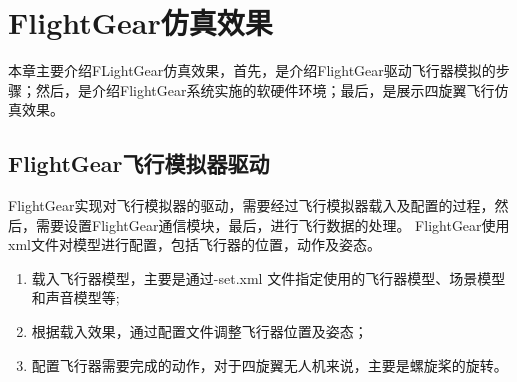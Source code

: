 \chapter{FlightGear仿真效果}\label{forward}

本章主要介绍FLightGear仿真效果，首先，是介绍FlightGear驱动飞行器模拟的步骤；然后，是介绍FlightGear系统实施的软硬件环境；最后，是展示四旋翼飞行仿真效果。
\section{FlightGear飞行模拟器驱动}
FlightGear实现对飞行模拟器的驱动，需要经过飞行模拟器载入及配置的过程，然后，需要设置FlightGear通信模块，最后，进行飞行数据的处理。  FlightGear使用xml文件对模型进行配置，包括飞行器的位置，动作及姿态。
\begin{enumerate}
  \item  载入飞行器模型，主要是通过-set.xml 文件指定使用的飞行器模型、场景模型和声音模型等;
  \item  根据载入效果，通过配置文件调整飞行器位置及姿态；
  \item  配置飞行器需要完成的动作，对于四旋翼无人机来说，主要是螺旋桨的旋转。
\end{enumerate}

